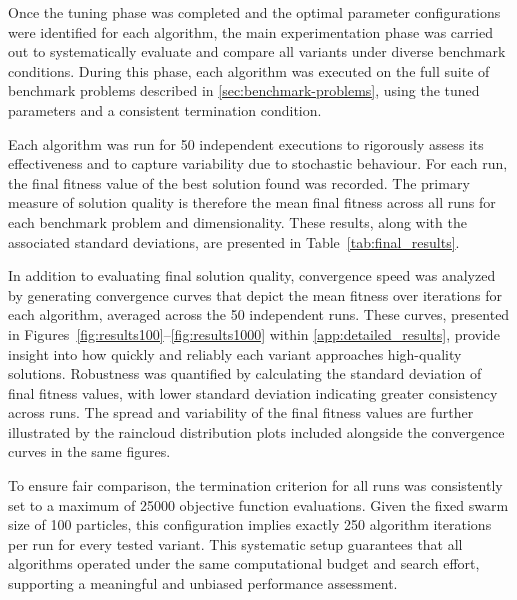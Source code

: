 {Once the tuning phase was completed and the optimal parameter configurations were identified for each algorithm, the main experimentation phase was carried out to systematically evaluate and compare all variants under diverse benchmark conditions. During this phase, each algorithm was executed on the full suite of benchmark problems described in \autoref{sec:benchmark-problems}, using the tuned parameters and a consistent termination condition.

Each algorithm was run for 50 independent executions to rigorously assess its effectiveness and to capture variability due to stochastic behaviour. For each run, the final fitness value of the best solution found was recorded. The primary measure of solution quality is therefore the mean final fitness across all runs for each benchmark problem and dimensionality. These results, along with the associated standard deviations, are presented in Table~\ref{tab:final_results}.

In addition to evaluating final solution quality, convergence speed was analyzed by generating convergence curves that depict the mean fitness over iterations for each algorithm, averaged across the 50 independent runs. These curves, presented in Figures~\ref{fig:results100}–\ref{fig:results1000} within \autoref{app:detailed_results}, provide insight into how quickly and reliably each variant approaches high-quality solutions. Robustness was quantified by calculating the standard deviation of final fitness values, with lower standard deviation indicating greater consistency across runs. The spread and variability of the final fitness values are further illustrated by the raincloud distribution plots included alongside the convergence curves in the same figures.


To ensure fair comparison, the termination criterion for all runs was consistently set to a maximum of 25000 objective function evaluations. Given the fixed swarm size of 100 particles, this configuration implies exactly 250 algorithm iterations per run for every tested variant. This systematic setup guarantees that all algorithms operated under the same computational budget and search effort, supporting a meaningful and unbiased performance assessment.







}
